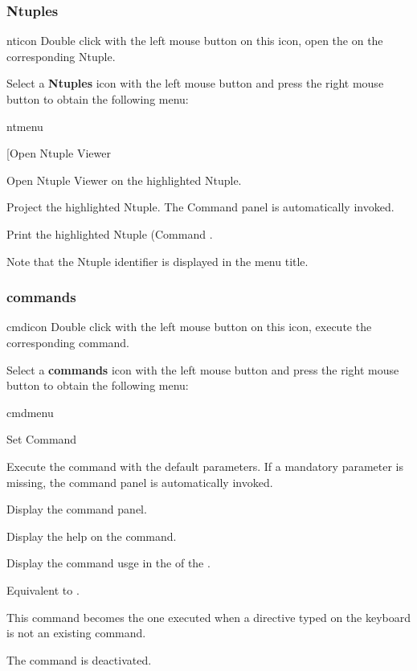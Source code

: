\subsubsection{Ntuples}
\begin{ICON}{nticon}
Double click with the left mouse button on this icon, open the \NV{} on the
corresponding Ntuple.
\end{ICON}

Select a {\bf Ntuples} icon with the left mouse button and press
the right mouse button to obtain the following menu:

\begin{PAWf}{ntmenu}
\begin{DLsf}{[Open Ntuple Viewer}
\item[Open Ntuple Viewer]    Open Ntuple Viewer on the highlighted Ntuple.
\item[Project...]            Project the highlighted Ntuple. The Command
                             panel  is automatically invoked.
\item[Print]                 Print the highlighted Ntuple (Command
                             .
\end{DLsf}
\end{PAWf}

Note that the Ntuple identifier is displayed in the menu title.


\subsubsection{\XPAW{} commands}
\begin{ICON}{cmdicon}
Double click with the left mouse button on this icon, execute the corresponding
\XPAW{} command.
\end{ICON}

Select a {\bf \XPAW{} commands} icon with the left mouse button and press
the right mouse button to obtain the following menu:

\begin{PAWf}[.2]{cmdmenu}
\begin{DLsf}{Set Command}
\item[Execute]      Execute the command with the default parameters. If
                    a mandatory parameter is missing, the command panel
                    is automatically invoked.
\item[Execute...]   Display the command panel.
\item[Help]         Display the help on the command.
\item[Usage]        Display the command usge in the \TP{} of the \EW.
\item[Manual]       Equivalent to .
\item[Set Command]  This command becomes the one executed when a directive
                    typed on the keyboard is not an existing \XPAW{} command.
\item[Deactivate]   The command is deactivated.
\end{DLsf}
\end{PAWf}

